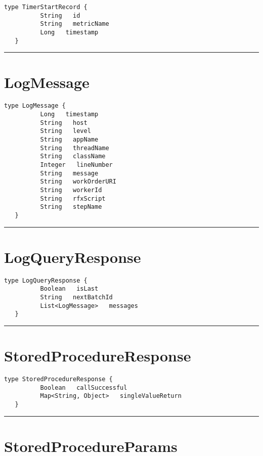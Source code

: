 \begin{lstlisting}[style=nonumbers]
   type TimerStartRecord {
          String   id
          String   metricName
          Long   timestamp
   }
\end{lstlisting}

\rule{12cm}{2pt}
\section{LogMessage}
\label{type:LogMessage}

\begin{lstlisting}[style=nonumbers]
   type LogMessage {
          Long   timestamp
          String   host
          String   level
          String   appName
          String   threadName
          String   className
          Integer   lineNumber
          String   message
          String   workOrderURI
          String   workerId
          String   rfxScript
          String   stepName
   }
\end{lstlisting}

\rule{12cm}{2pt}
\section{LogQueryResponse}
\label{type:LogQueryResponse}

\begin{lstlisting}[style=nonumbers]
   type LogQueryResponse {
          Boolean   isLast
          String   nextBatchId
          List<LogMessage>   messages
   }
\end{lstlisting}

\rule{12cm}{2pt}
\section{StoredProcedureResponse}
\label{type:StoredProcedureResponse}

\begin{lstlisting}[style=nonumbers]
   type StoredProcedureResponse {
          Boolean   callSuccessful
          Map<String, Object>   singleValueReturn
   }
\end{lstlisting}

\rule{12cm}{2pt}
\section{StoredProcedureParams}
\label{type:StoredProcedureParams}

